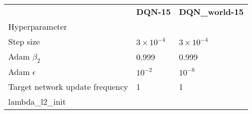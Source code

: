 \begin{tabular}{lll}
 & \bfseries DQN-15 & \bfseries DQN_world-15 \\
Hyperparameter &  &  \\
Step size & $3 \times 10^{-4}$ & $3 \times 10^{-4}$ \\
Adam $\beta_2$ & 0.999 & 0.999 \\
Adam $\epsilon$ & $10^{-2}$ & $10^{-8}$ \\
Target network update frequency & 1 & 1 \\
lambda_l2_init &  &  \\
\end{tabular}
